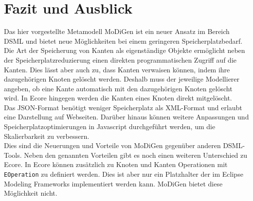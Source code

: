 \section{Fazit und Ausblick}
Das hier vorgestellte Metamodell MoDiGen ist ein neuer Ansatz im Bereich DSML und bietet neue Möglichkeiten bei einem geringeren Speicherplatzbedarf. Die Art der Speicherung von Kanten als eigenständige Objekte ermöglicht neben der Speicherplatzreduzierung einen direkten programmatischen Zugriff auf die Kanten. Dies lässt aber auch zu, dass Kanten verwaisen können, indem ihre dazugehörigen Knoten gelöscht werden. Deshalb muss der jeweilige Modellierer angeben, ob eine Kante automatisch mit den dazugehörigen Knoten gelöscht wird. In Ecore hingegen werden die Kanten eines Knoten direkt mitgelöscht.\\
Das JSON-Format benötigt weniger Speicherplatz als XML-Format und erlaubt eine Darstellung auf Webseiten. Darüber hinaus können weitere Anpassungen und Speicherplatzoptimierungen in Javascript durchgeführt werden, um die Skalierbarkeit zu verbessern. \\
Dies sind die Neuerungen und Vorteile von MoDiGen gegenüber  anderen DSML-Tools. Neben den genannten Vorteilen gibt es noch einen weiteren Unterschied zu Ecore. In Ecore können zusätzlich zu Knoten und Kanten Operationen mit \texttt{EOperation} zu definiert werden. Dies ist aber nur ein Platzhalter der im Eclipse Modeling Frameworks implementiert werden kann. MoDiGen bietet diese Möglichkeit nicht. \\